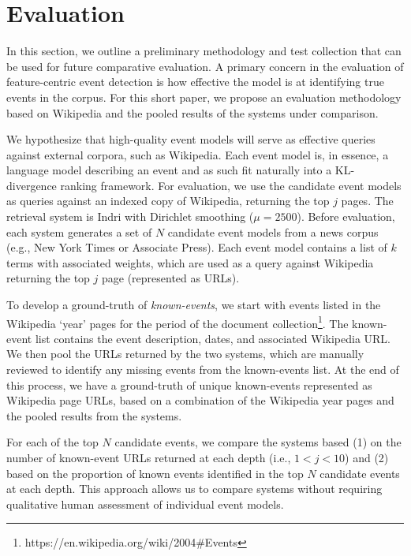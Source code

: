\documentclass{sig-alternate}
\begin{document}
\section{Evaluation}

In this section, we outline a preliminary methodology and test collection that can be used for future comparative evaluation. A primary concern in the evaluation of feature-centric event detection is how effective the model is at identifying true events in the corpus. For this short paper, we propose an evaluation methodology based on Wikipedia and the pooled results of the systems under comparison.

We hypothesize that high-quality event models will serve as effective queries against external corpora, such as Wikipedia. Each event model is, in essence, a language model describing an event and as such fit naturally into a KL-divergence ranking framework. For evaluation, we use the candidate event models as queries against an indexed copy of Wikipedia, returning the top $j$ pages. The retrieval system is Indri with Dirichlet smoothing ($\mu=2500$). 
Before evaluation, each system generates a set of $N$ candidate event models from a news corpus (e.g., New York Times or Associate Press). Each event model contains a list of $k$ terms with associated weights, which are used as a query against Wikipedia returning the top $j$ page (represented as URLs).

To develop a ground-truth of \emph{known-events}, we start with events listed in the Wikipedia `year' pages for the period of the document collection\footnote{https://en.wikipedia.org/wiki/2004\#Events}. The known-event list contains the event description, dates, and associated Wikipedia URL. We then pool the URLs returned by the two systems, which are manually reviewed to identify any missing events from the known-events list.  At the end of this process, we have a ground-truth of unique known-events represented as Wikipedia page URLs, based on a combination of the Wikipedia year pages and the pooled results from the systems.  

For each of the top $N$ candidate events, we compare the systems based (1) on the number of known-event URLs returned at each depth (i.e., $1 < j < 10$) and (2) based on the proportion of known events identified in the top $N$ candidate events at each depth.  This approach allows us to compare systems without requiring qualitative human assessment of individual event models.
\end{document}

